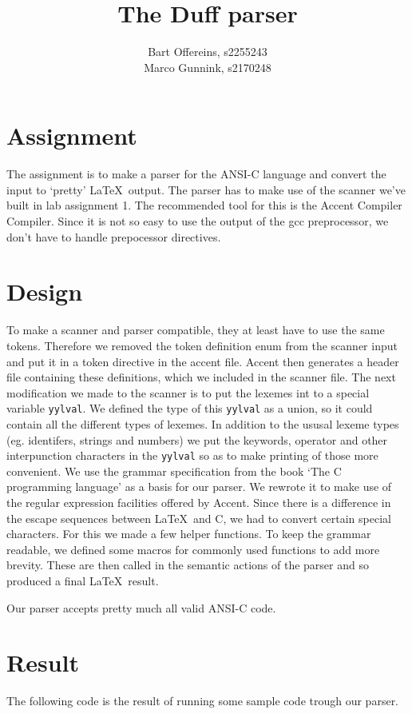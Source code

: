 \documentclass{article}
\title{The Duff parser}
\author{Bart Offereins, s2255243\\ Marco Gunnink, s2170248}
\begin{document}
\maketitle

\section*{Assignment}

The assignment is to make a parser for the ANSI-C language and convert the input to `pretty' \LaTeX \ output. The parser has to make use of the scanner we've built in lab assignment 1. The recommended tool for this is the Accent Compiler Compiler. Since it is not so easy to use the output of the gcc preprocessor, we don't have to handle prepocessor directives. 

\section*{Design}

To make a scanner and parser compatible, they at least have to use the same tokens. Therefore we removed the token definition enum from the scanner input and put it in a token directive in the accent file. Accent then generates a header file containing these definitions, which we included in the scanner file. The next modification we made to the scanner is to put the lexemes int to a special variable \lstinline{yylval}. We defined the type of this \lstinline{yylval} as a union, so it could contain all the different types of lexemes. In addition to the ususal lexeme types (eg. identifers, strings and numbers) we put the keywords, operator and other interpunction characters in the \lstinline{yylval} so as to make printing of those more convenient. We use the grammar specification from the book `The C programming language' as a basis for our parser. We rewrote it to make use of the regular expression facilities offered by Accent.
Since there is a difference in the escape sequences between \LaTeX \ and C, we had to convert certain special characters. For this we made a few helper functions. To keep the grammar readable, we defined some macros for commonly used functions to add more brevity. These are then called in the semantic actions of the parser and so produced a final \LaTeX \ result.

Our parser accepts pretty much all valid ANSI-C code.

\pagebreak

\section*{Result}

The following code is the result of running some sample code trough our parser.


\end{document}
